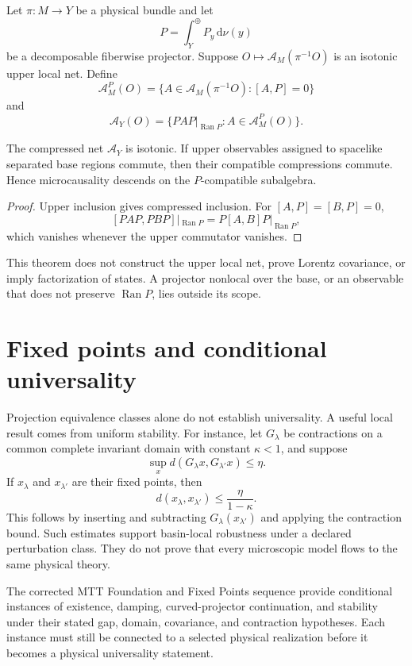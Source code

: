 \documentclass[11pt]{article}
\begin{document}
Let $\pi:M\to Y$ be a physical bundle and let
\[
  P=\int_Y^{\oplus}P_y\,\mathrm d\nu(y)
\]
be a decomposable fiberwise projector.  Suppose
$O\mapsto\mathcal A_M(\pi^{-1}O)$ is an isotonic upper local net.  Define
\[
  \mathcal A_M^P(O)
  =\{A\in\mathcal A_M(\pi^{-1}O):[A,P]=0\}
\]
and
\[
  \mathcal A_Y(O)
  =\{PAP|_{\operatorname{Ran}P}:A\in\mathcal A_M^P(O)\}.
\]

\begin{theorem}\label{thm:locality}
The compressed net $\mathcal A_Y$ is isotonic.  If upper observables assigned
to spacelike separated base regions commute, then their compatible
compressions commute.  Hence microcausality descends on the $P$-compatible
subalgebra.
\end{theorem}

\begin{proof}
Upper inclusion gives compressed inclusion.  For $[A,P]=[B,P]=0$,
\[
 [PAP,PBP]|_{\operatorname{Ran}P}
 =P[A,B]P|_{\operatorname{Ran}P},
\]
which vanishes whenever the upper commutator vanishes.
\end{proof}

This theorem does not construct the upper local net, prove Lorentz covariance,
or imply factorization of states.  A projector nonlocal over the base, or an
observable that does not preserve $\operatorname{Ran}P$, lies outside its
scope.

\section{Fixed points and conditional universality}

Projection equivalence classes alone do not establish universality.  A useful
local result comes from uniform stability.  For instance, let $G_\lambda$ be
contractions on a common complete invariant domain with constant
$\kappa<1$, and suppose
\[
  \sup_x d(G_\lambda x,G_{\lambda'}x)\leq\eta.
\]
If $x_\lambda$ and $x_{\lambda'}$ are their fixed points, then
\[
 d(x_\lambda,x_{\lambda'})
 \leq \frac{\eta}{1-\kappa}.
\]
This follows by inserting and subtracting
$G_\lambda(x_{\lambda'})$ and applying the contraction bound.  Such estimates
support basin-local robustness under a declared perturbation class.  They do
not prove that every microscopic model flows to the same physical theory.

The corrected MTT Foundation and Fixed Points sequence provide conditional
instances of existence, damping, curved-projector continuation, and stability
under their stated gap, domain, covariance, and contraction hypotheses.  Each
instance must still be connected to a selected physical realization before it
becomes a physical universality statement.
\end{document}

